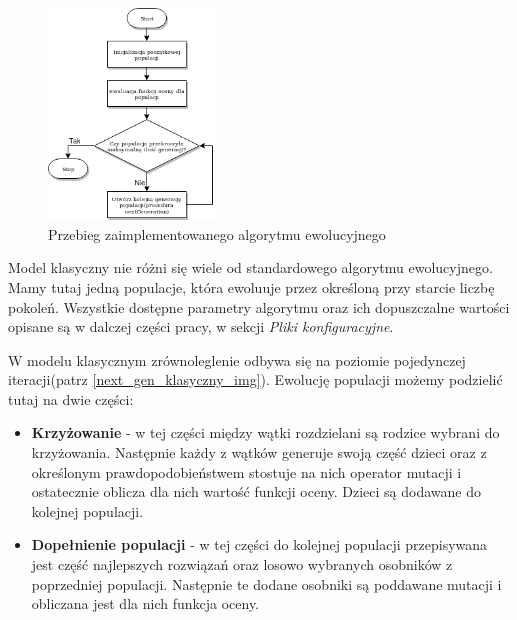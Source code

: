 \begin{figure}[H]
    \centering        
    \includegraphics[width=0.4\textwidth]{img/alg_main.png}
    \caption{Przebieg zaimplementowanego algorytmu ewolucyjnego}
    \label{alg_main_img}
\end{figure}

Model klasyczny nie różni się wiele od standardowego algorytmu ewolucyjnego. Mamy tutaj jedną populacje, która ewoluuje przez 
określoną przy starcie liczbę pokoleń. Wszystkie dostępne parametry algorytmu oraz ich dopuszczalne wartości opisane są w dalczej części pracy, 
w sekcji \textit{Pliki konfiguracyjne}.

W modelu klasycznym zrównoleglenie odbywa się na poziomie pojedynczej iteracji(patrz \ref{next_gen_klasyczny_img}). 
Ewolucję populacji możemy podzielić tutaj na dwie części:
\begin{itemize}
    \item \textbf{Krzyżowanie} - w tej części między wątki rozdzielani są rodzice wybrani do krzyżowania. Następnie każdy z wątków generuje swoją część 
    dzieci oraz z określonym prawdopodobieństwem stostuje na nich operator mutacji i ostatecznie oblicza dla nich wartość funkcji oceny. 
    Dzieci są dodawane do kolejnej populacji.
    \item \textbf{Dopełnienie populacji} - w tej części do kolejnej populacji przepisywana jest część najlepszych rozwiązań oraz losowo wybranych osobników 
    z poprzedniej populacji. Następnie te dodane osobniki są poddawane mutacji i obliczana jest dla nich funkcja oceny.
\end{itemize}

